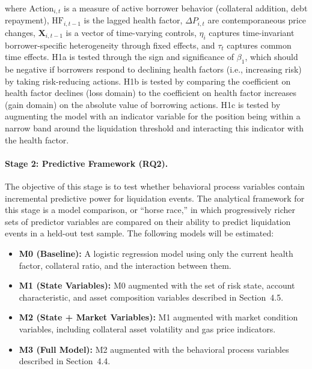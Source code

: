 where \(\text{Action}_{i,t}\) is a measure of active borrower behavior (collateral addition, debt repayment), \(\text{HF}_{i,t-1}\) is the lagged health factor, \(\Delta P_{i,t}\) are contemporaneous price changes, \(\mathbf{X}_{i,t-1}\) is a vector of time-varying controls, \(\eta_i\) captures time-invariant borrower-specific heterogeneity through fixed effects, and \(\tau_t\) captures common time effects. H1a is tested through the sign and significance of \(\beta_1\), which should be negative if borrowers respond to declining health factors (i.e., increasing risk) by taking risk-reducing actions. H1b is tested by comparing the coefficient on health factor declines (loss domain) to the coefficient on health factor increases (gain domain) on the absolute value of borrowing actions. H1c is tested by augmenting the model with an indicator variable for the position being within a narrow band around the liquidation threshold and interacting this indicator with the health factor.

\paragraph{Stage 2: Predictive Framework (RQ2).} The objective of this stage is to test whether behavioral process variables contain incremental predictive power for liquidation events. The analytical framework for this stage is a model comparison, or ``horse race,'' in which progressively richer sets of predictor variables are compared on their ability to predict liquidation events in a held-out test sample. The following models will be estimated:

\begin{itemize}[leftmargin=*,labelindent=\parindent, itemindent=0pt]
\item \textbf{M0 (Baseline):} A logistic regression model using only the current health factor, collateral ratio, and the interaction between them.
\item \textbf{M1 (State Variables):} M0 augmented with the set of risk state, account characteristic, and asset composition variables described in Section~4.5.
\item \textbf{M2 (State + Market Variables):} M1 augmented with market condition variables, including collateral asset volatility and gas price indicators.
\item \textbf{M3 (Full Model):} M2 augmented with the behavioral process variables described in Section~4.4.
\end{itemize}

